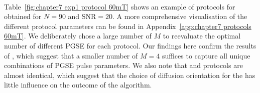 \paragraph{}
Table~\ref{fig:chapter7 exp1 protocol 60mT} shows an example of protocols for obtained for $N=90$ and SNR$=20$. A more comprehensive visualisation of the different protocol parameters can be found in Appendix~\ref{app:chapter7 protocols 60mT}. We deliberately chose a large number of $M$ to reevaluate the optimal number of different PGSE for each protocol. Our findings here confirm the results of \citep{Alexander:2008}, which suggest that a smaller number of $M=4$ suffices to capture all unique combinations of PGSE pulse parameters. We also note that {\OI} and {\SD} protocols are almost identical, which suggest that the choice of diffusion orientation for the {\OI} has little influence on the outcome of the algorithm.
